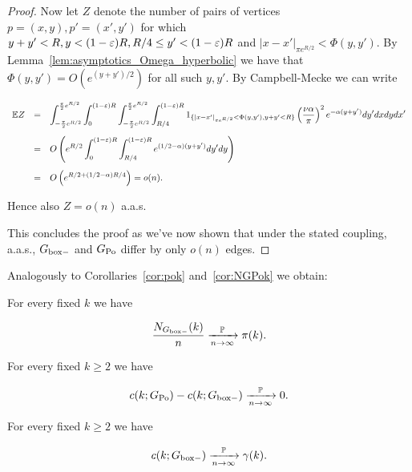 \begin{proof}
Now let $Z$ denote the number of pairs of vertices $p = (x,y), p'=(x',y')$
for which $y+y'<R, y < (1-\varepsilon)R, R/4 \leq y' < (1-\varepsilon)R$ and $|x-x'|_{\pi e^{R/2}} < \Phi(y,y')$.
By Lemma~\ref{lem:asymptotics_Omega_hyperbolic} we have that $\Phi(y,y') = O( e^{(y+y')/2} )$ 
for all such $y,y'$.
By Campbell-Mecke we can write

$$ \begin{array}{rcl} 
{\mathbb E} Z 
& = & \displaystyle
\int_{-\frac{\pi}{2}e^{R/2}}^{\frac{\pi}{2}e^{R/2}}\int_0^{(1-\varepsilon)R}
\int_{-\frac{\pi}{2}e^{R/2}}^{\frac{\pi}{2}e^{R/2}}\int_{R/4}^{(1-\varepsilon)R} 
1_{\{|x-x'|_{\pi e^{R/2}}<\Phi(y,y'), y+y'<R\}}\left(\frac{\nu\alpha}{\pi}\right)^2 e^{-\alpha(y+y')}dy'dxdydx' \\[4ex]
& = & \displaystyle
O\left( e^{R/2} \int_0^{(1-\varepsilon)R} \int_{R/4}^{(1-\varepsilon)R} e^{(1/2-\alpha)(y+y')} dy'dy \right) \\[4ex]
& = & \displaystyle
O\left( e^{R/2 + (1/2-\alpha) R/4} \right) = o(n).
\end{array} $$ 

\noindent
Hence also $Z = o(n)$ a.a.s.

This concludes the proof as we've now shown that under the stated coupling, a.a.s., $G_{\mathrm{box}-}$ and $G_{{\mathrm{Po}}}$ differ by only $o(n)$ edges.
\end{proof}

Analogously to Corollaries~\ref{cor:pok} and~\ref{cor:NGPok} we obtain:

\begin{corollary}\label{cor:GPoHdegseq}
For every fixed $k$ we have 

$$\frac{N_{G_{\mathrm{box}-}}(k)}{n} \xrightarrow[n\to\infty]{\mathbb{P}} {\pi}(k). $$

\end{corollary}

\begin{corollary}\label{cor:GPoGboxH}
For every fixed $k\geq 2$ we have 

$$c(k;G_{{\mathrm{Po}}}) - c(k;G_{\mathrm{box}-}) \xrightarrow[n \rightarrow \infty]{\mathbb{P}} 0. $$

\end{corollary}


\begin{lemma}\label{lem:ckGboxH} 
For every fixed $k\geq 2$ we have

 $$ c(k;G_{\mathrm{box}-}) \xrightarrow[n \rightarrow \infty]{\mathbb{P}}  \gamma(k). $$

 \end{lemma}

